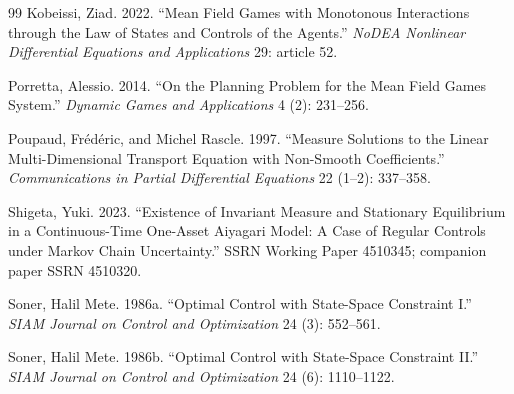 \documentclass[11pt]{article}
\theoremstyle{definition}
\theoremstyle{remark}
\begin{document}
\begin{thebibliography}{99}
Kobeissi, Ziad. 2022. ``Mean Field Games with Monotonous Interactions
through the Law of States and Controls of the Agents.'' \emph{NoDEA
Nonlinear Differential Equations and Applications} 29: article 52.

Porretta, Alessio. 2014. ``On the Planning Problem for the Mean Field
Games System.'' \emph{Dynamic Games and Applications} 4 (2):
231--256.

Poupaud, Fr\'ed\'eric, and Michel Rascle. 1997. ``Measure Solutions
to the Linear Multi-Dimensional Transport Equation with Non-Smooth
Coefficients.'' \emph{Communications in Partial Differential
Equations} 22 (1--2): 337--358.

Shigeta, Yuki. 2023. ``Existence of Invariant Measure and Stationary
Equilibrium in a Continuous-Time One-Asset Aiyagari Model: A Case of
Regular Controls under Markov Chain Uncertainty.'' SSRN Working Paper
4510345; companion paper SSRN 4510320.

Soner, Halil Mete. 1986a. ``Optimal Control with State-Space
Constraint I.'' \emph{SIAM Journal on Control and Optimization} 24
(3): 552--561.

Soner, Halil Mete. 1986b. ``Optimal Control with State-Space
Constraint II.'' \emph{SIAM Journal on Control and Optimization} 24
(6): 1110--1122.

\end{thebibliography}
\end{document}
